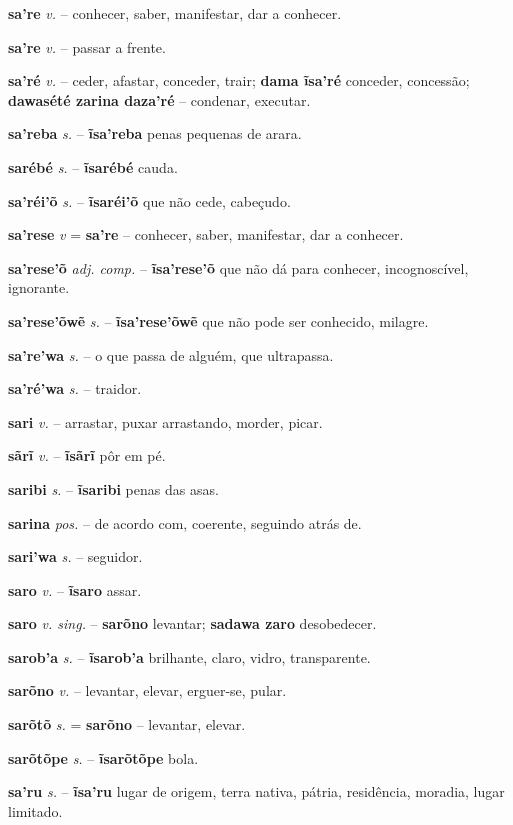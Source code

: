 \textbf{sa're} \textit{v.} -- conhecer, saber, manifestar, dar a conhecer.

\textbf{sa're} \textit{v.} -- passar a frente.

\textbf{sa'ré} \textit{v.} -- ceder, afastar, conceder, trair; \textbf{dama ĩsa'ré} conceder, concessão; \textbf{dawasété zarina daza'ré} -- condenar, executar.

\textbf{sa'reba} \textit{s.} -- \textbf{ĩsa'reba} penas pequenas de arara.

\textbf{sarébé} \textit{s.} -- \textbf{ĩsarébé} cauda.

\textbf{sa'réi'õ} \textit{s.} -- \textbf{ĩsaréi'õ} que não cede, cabeçudo.

\textbf{sa'rese} \textit{v} = \textbf{sa're} -- conhecer, saber, manifestar, dar a conhecer.

\textbf{sa'rese'õ} \textit{adj. comp.} -- \textbf{ĩsa'rese'õ} que não dá para conhecer, incognoscível, ignorante.

\textbf{sa'rese'õwẽ} \textit{s.} -- \textbf{ĩsa'rese'õwẽ} que não pode ser conhecido, milagre.

\textbf{sa're'wa} \textit{s.} -- o que passa de alguém, que ultrapassa.

\textbf{sa'ré'wa} \textit{s.} -- traidor.

\textbf{sari} \textit{v.} -- arrastar, puxar arrastando, morder, picar.

\textbf{sãrĩ} \textit{v.} -- \textbf{ĩsãrĩ} pôr em pé.

\textbf{saribi} \textit{s.} -- \textbf{ĩsaribi} penas das asas.

\textbf{sarina} \textit{pos.} -- de acordo com, coerente, seguindo atrás de.

\textbf{sari'wa} \textit{s.} -- seguidor.

\textbf{saro} \textit{v.} -- \textbf{ĩsaro} assar.

\textbf{saro} \textit{v. sing.} -- \textbf{sarõno} levantar; \textbf{sadawa zaro} desobedecer.

\textbf{sarob'a} \textit{s.} -- \textbf{ĩsarob'a} brilhante, claro, vidro, transparente.

\textbf{sarõno} \textit{v.} -- levantar, elevar, erguer-se, pular.

\textbf{sarõtõ} \textit{s.} = \textbf{sarõno} -- levantar, elevar.

\textbf{sarõtõpe} \textit{s.} -- \textbf{ĩsarõtõpe} bola.

\textbf{sa'ru} \textit{s.} -- \textbf{ĩsa'ru} lugar de origem, terra nativa, pátria, residência, moradia, lugar limitado.

